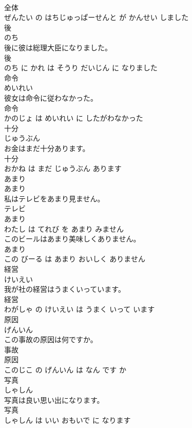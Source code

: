 \documentclass[8pt]{extreport}
\begin{document}
\begin{CJK}{UTF8}{min}
\\	全体 
\\	ぜんたい の はちじゅっぱーせんと が かんせい しました			
\\	後	
\\	のち			
\\	後に彼は総理大臣になりました。	
\\	後 
\\	のち に かれ は そうり だいじん に なりました			
\\	命令	
\\	めいれい			
\\	彼女は命令に従わなかった。	
\\	命令 
\\	かのじょ は めいれい に したがわなかった			
\\	十分	
\\	じゅうぶん			
\\	お金はまだ十分あります。	
\\	十分 
\\	おかね は まだ じゅうぶん あります			
\\	あまり	
\\	あまり			
\\	私はテレビをあまり見ません。	
\\	テレビ 
\\	あまり 
\\	わたし は てれび を あまり みません			
\\	このビールはあまり美味しくありません。	
\\	あまり 
\\	この びーる は あまり おいしく ありません			
\\	経営	
\\	けいえい			
\\	我が社の経営はうまくいっています。	
\\	経営 
\\	わがしゃ の けいえい は うまく いって います			
\\	原因	
\\	げんいん			
\\	この事故の原因は何ですか。	
\\	事故 
\\	原因 
\\	このじこ の げんいん は なん です か			
\\	写真	
\\	しゃしん			
\\	写真は良い思い出になります。	
\\	写真 
\\	しゃしん は いい おもいで に なります			

\end{CJK}
\end{document}
